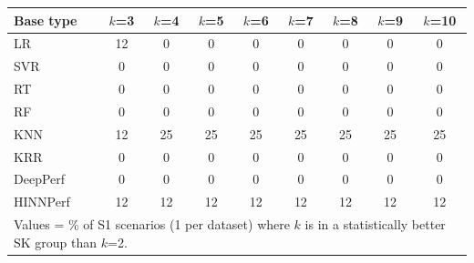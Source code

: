 \begin{tabular}{lcccccccc}
\toprule
Base type & $k$=3 & $k$=4 & $k$=5 & $k$=6 & $k$=7 & $k$=8 & $k$=9 & $k$=10 \\
\midrule
LR & 12 & 0 & 0 & 0 & 0 & 0 & 0 & 0 \\
SVR & 0 & 0 & 0 & 0 & 0 & 0 & 0 & 0 \\
RT & 0 & 0 & 0 & 0 & 0 & 0 & 0 & 0 \\
RF & 0 & 0 & 0 & 0 & 0 & 0 & 0 & 0 \\
KNN & 12 & 25 & 25 & 25 & 25 & 25 & 25 & 25 \\
KRR & 0 & 0 & 0 & 0 & 0 & 0 & 0 & 0 \\
DeepPerf & 0 & 0 & 0 & 0 & 0 & 0 & 0 & 0 \\
HINNPerf & 12 & 12 & 12 & 12 & 12 & 12 & 12 & 12 \\
\bottomrule
\multicolumn{9}{l}{\footnotesize Values = \% of S1 scenarios (1 per dataset) where $k$ is in a statistically better SK group than $k$=2.}} \\
\end{tabular}
